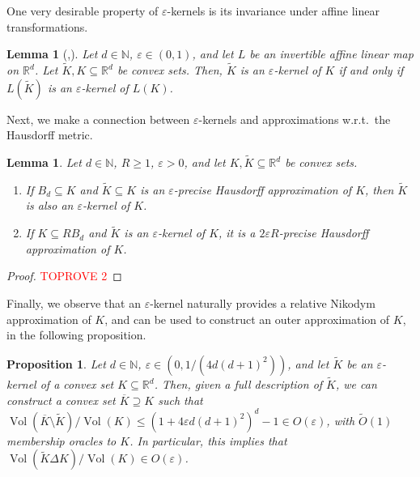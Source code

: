 \documentclass[11pt]{article}
\newtheorem{lemma}[theorem]{Lemma}
\newtheorem{proposition}[theorem]{Proposition}
\newcommand{\N}{\ensuremath{\mathbb{N}}}
\newcommand{\R}{\ensuremath{\mathbb{R}}}
\DeclareMathOperator{\Vol}{Vol}
\begin{document}
    One very desirable property of $\varepsilon$-kernels is its invariance under affine linear transformations.

    \begin{lemma}[{\cite{agarwal2004approximating},\cite[Lemma~2.5]{agarwal2024computing}}]
        \label{prop:eps-kernel-affine-transform}
        Let $d \in \N$, $\varepsilon \in (0,1)$, and let $L$ be an invertible affine linear map on $\R^d$. Let $\widetilde{K},K \subseteq \R^d$ be convex sets. Then, $\widetilde{K}$ is an $\varepsilon$-kernel of $K$ if and only if $L(\widetilde{K})$ is an $\varepsilon$-kernel of $L(K)$.
    \end{lemma}

    Next, we make a connection between $\varepsilon$-kernels and approximations w.r.t.\ the Hausdorff metric.

    \begin{lemma}
        \label{lem:eps-kernel-hausdorff}
        Let $d \in \N$, $R \geq 1$, $\varepsilon > 0$, and let $K, \widetilde{K} \subseteq \R^d$ be convex sets.
        \begin{enumerate}[nosep]
            \item If $B_d \subseteq K$ and $\widetilde{K} \subseteq K$ is an $\varepsilon$-precise Hausdorff approximation of $K$, then $\widetilde{K}$ is also an $\varepsilon$-kernel of $K$.
            \item If $K \subseteq RB_d$ and $\widetilde{K}$ is an $\varepsilon$-kernel of $K$, it is a $2\varepsilon R$-precise Hausdorff approximation of $K$.
        \end{enumerate}
    \end{lemma}

    \begin{proof}\textcolor{red}{TOPROVE 2}\end{proof}

    Finally, we observe that an $\varepsilon$-kernel naturally provides a relative Nikodym approximation of $K$, and can be used to construct an outer approximation of $K$, in the following proposition.

    \begin{proposition}
        \label{prop:eps-kernel-volumetric-approximation}
        Let $d \in \N$, $\varepsilon \in (0,1/(4d(d+1)^2))$, and let $\widetilde{K}$ be an $\varepsilon$-kernel of a convex set $K \subseteq \R^d$. Then, given a full description of $\widetilde{K}$, we can construct a convex set $\overline{K} \supseteq K$ such that $\Vol(\overline{K} \setminus \widetilde{K})/\Vol(K) \leq (1+4\varepsilon d(d+1)^2)^d - 1 \in O(\varepsilon)$, with $\widetilde{O}(1)$ membership oracles to $K$. In particular, this implies that $\Vol(\widetilde{K} \Delta K)/\Vol(K) \in O(\varepsilon)$.
    \end{proposition}
\end{document}
